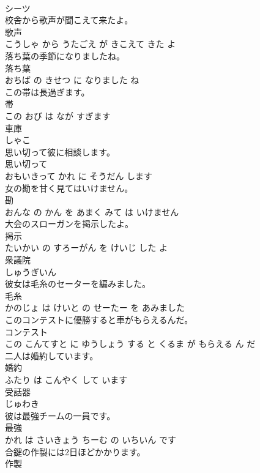 \documentclass[8pt]{extreport}
\begin{document}
\begin{CJK}{UTF8}{min}
\\	シーツ	
\\	校舎から歌声が聞こえて来たよ。	
\\	歌声 
\\	こうしゃ から うたごえ が きこえて きた よ			
\\	落ち葉の季節になりましたね。	
\\	落ち葉 
\\	おちば の きせつ に なりました ね			
\\	この帯は長過ぎます。	
\\	帯 
\\	この おび は なが すぎます			
\\	車庫	
\\	しゃこ			
\\	思い切って彼に相談します。	
\\	思い切って 
\\	おもいきって かれ に そうだん します			
\\	女の勘を甘く見てはいけません。	
\\	勘 
\\	おんな の かん を あまく みて は いけません			
\\	大会のスローガンを掲示したよ。	
\\	掲示 
\\	たいかい の すろーがん を けいじ した よ			
\\	衆議院	
\\	しゅうぎいん			
\\	彼女は毛糸のセーターを編みました。	
\\	毛糸 
\\	かのじょ は けいと の せーたー を あみました			
\\	このコンテストに優勝すると車がもらえるんだ。	
\\	コンテスト 
\\	この こんてすと に ゆうしょう する と くるま が もらえる ん だ			
\\	二人は婚約しています。	
\\	婚約 
\\	ふたり は こんやく して います			
\\	受話器	
\\	じゅわき			
\\	彼は最強チームの一員です。	
\\	最強 
\\	かれ は さいきょう ちーむ の いちいん です			
\\	合鍵の作製には2日ほどかかります。	
\\	作製 

\end{CJK}
\end{document}
